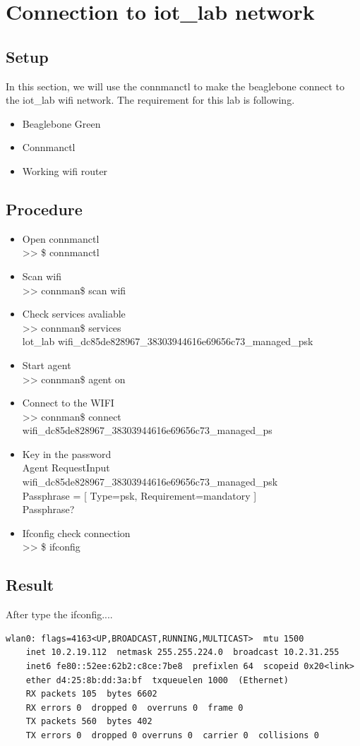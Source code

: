 \documentclass{article}
\begin{document}
\section{Connection to iot\_lab network}
\subsection{Setup}
In this section, we will use the connmanctl to make the beaglebone connect to the iot\_lab wifi network. The requirement for this lab is following.
\begin{itemize}
	\item Beaglebone Green
	\item Connmanctl
	\item Working wifi router
\end{itemize}
\subsection{Procedure}
\begin{itemize}
	\item  Open connmanctl\\>> \$ connmanctl 
	\item Scan wifi \\>> connman\$ scan wifi 
	\item Check services avaliable \\>> connman\$ services \\lot\_lab wifi\_dc85de828967\_38303944616e69656c73\_managed\_psk  
	\item Start agent \\>> connman\$ agent on 
	\item Connect to the WIFI \\>> connman\$ connect  wifi\_dc85de828967\_38303944616e69656c73\_managed\_ps 
	\item Key in the password \\Agent RequestInput wifi\_dc85de828967\_38303944616e69656c73\_managed\_psk \\Passphrase = [ Type=psk, Requirement=mandatory ] \\Passphrase?  
	\item Ifconfig check connection \\>> \$ ifconfig 
\end{itemize}
\subsection{Result}
After type the ifconfig....
\begin{lstlisting}
wlan0: flags=4163<UP,BROADCAST,RUNNING,MULTICAST>  mtu 1500
	inet 10.2.19.112  netmask 255.255.224.0  broadcast 10.2.31.255
	inet6 fe80::52ee:62b2:c8ce:7be8  prefixlen 64  scopeid 0x20<link>
	ether d4:25:8b:dd:3a:bf  txqueuelen 1000  (Ethernet)
	RX packets 105  bytes 6602
	RX errors 0  dropped 0  overruns 0  frame 0
	TX packets 560  bytes 402
	TX errors 0  dropped 0 overruns 0  carrier 0  collisions 0
\end{lstlisting}
\clearpage
\end{document}
